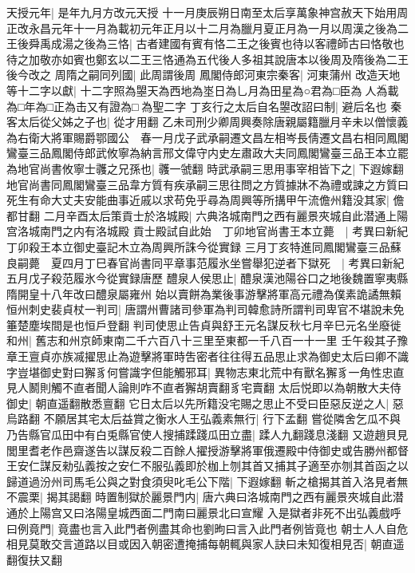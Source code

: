 天授元年|{
	是年九月方改元天授}
十一月庚辰朔日南至太后享萬象神宫赦天下始用周正改永昌元年十一月為載初元年正月以十二月為臘月夏正月為一月以周漢之後為二王後舜禹成湯之後為三恪|{
	古者建國有賓有恪二王之後賓也待以客禮師古曰恪敬也待之加敬亦如賓也鄭玄以二王三恪通為五代後人多祖其說唐本以後周及隋後為二王後今改之}
周隋之嗣同列國|{
	此周謂後周}
鳳閣侍郎河東宗秦客|{
	河東蒲州}
改造天地等十二字以獻|{
	十二字照為曌天為西地為埊日為乚月為田星為○君為□臣為人為載為□年為□正為击又有證為□為聖二字}
丁亥行之太后自名曌改詔曰制|{
	避后名也}
秦客太后從父姊之子也|{
	從才用翻}
乙未司刑少卿周興奏除唐親屬籍臘月辛未以僧懷義為右衛大將軍賜爵鄂國公　春一月戊子武承嗣遷文昌左相岑長倩遷文昌右相同鳳閣鸞臺三品鳳閣侍郎武攸寧為納言邢文偉守内史左肅政大夫同鳳閣鸞臺三品王本立罷為地官尚書攸寧士彠之兄孫也|{
	彠一虢翻}
時武承嗣三思用事宰相皆下之|{
	下遐嫁翻}
地官尚書同鳳閣鸞臺三品韋方質有疾承嗣三思往問之方質據牀不為禮或諫之方質曰死生有命大丈夫安能曲事近戚以求苟免乎尋為周興等所搆甲午流儋州籍没其家|{
	儋都甘翻}
二月辛酉太后策貢士於洛城殿|{
	六典洛城南門之西有麗景夾城自此潜通上陽宫洛城南門之内有洛城殿}
貢士殿試自此始　丁卯地官尚書王本立薨　|{
	考異曰新紀丁卯殺王本立御史臺記木立為周興所誅今從實録}
三月丁亥特進同鳳閣鸞臺三品蘇良嗣薨　夏四月丁巳春官尚書同平章事范履氷坐嘗舉犯逆者下獄死　|{
	考異曰新紀五月戊子殺范履氷今從實録唐歷}
醴泉人侯思止|{
	醴泉漢池陽谷口之地後魏置寧夷縣隋開皇十八年改曰醴泉屬雍州}
始以賣餅為業後事游擊將軍高元禮為僕素詭譎無賴恒州刺史裴貞杖一判司|{
	唐謂州曹諸司參軍為判司韓愈詩所謂判司卑官不堪說未免箠楚塵埃間是也恒戶登翻}
判司使思止告貞與舒王元名謀反秋七月辛巳元名坐廢徙和州|{
	舊志和州京師東南二千六百八十三里至東都一千八百一十一里}
壬午殺其子豫章王亶貞亦族㓕擢思止為遊擊將軍時吿密者往往得五品思止求為御史太后曰卿不識字豈堪御史對曰獬豸何嘗識字但能觸邪耳|{
	異物志東北荒中有獸名獬豸一角性忠直見人鬭則觸不直者聞人論則咋不直者獬胡賣翻豸宅賣翻}
太后悦即以為朝散大夫侍御史|{
	朝直遥翻散悉亶翻}
它日太后以先所籍没宅賜之思止不受曰臣惡反逆之人|{
	惡烏路翻}
不願居其宅太后益賞之衡水人王弘義素無行|{
	行下孟翻}
嘗從隣舍乞瓜不與乃告縣官瓜田中有白兎縣官使人搜捕蹂踐瓜田立盡|{
	蹂人九翻踐息淺翻}
又遊趙貝見閭里耆老作邑齋遂告以謀反殺二百餘人擢授游擊將軍俄遷殿中侍御史或告勝州都督王安仁謀反勑弘義按之安仁不服弘義即於枷上刎其首又捕其子適至亦刎其首函之以歸道過汾州司馬毛公與之對食須臾叱毛公下階|{
	下遐嫁翻}
斬之槍揭其首入洛見者無不震栗|{
	揭其謁翻}
時置制獄於麗景門内|{
	唐六典曰洛城南門之西有麗景夾城自此潜通於上陽宫又曰洛陽皇城西面二門南曰麗景北曰宣耀}
入是獄者非死不出弘義戲呼曰例竟門|{
	竟盡也言入此門者例盡其命也劉昫曰言入此門者例皆竟也}
朝士人人自危相見莫敢交言道路以目或因入朝密遭掩捕每朝輒與家人訣曰未知復相見否|{
	朝直遥翻復扶又翻}
